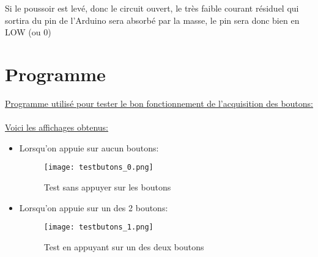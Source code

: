 	Si le poussoir est levé, donc le circuit ouvert, le très faible courant résiduel qui sortira du pin de l'Arduino sera absorbé par la masse, le pin sera donc bien en LOW (ou 0)



\newpage
\section{Programme}
\underline{Programme utilisé pour tester le bon fonctionnement de l'acquisition des boutons:}


\newpage
\paragraph{}
\underline{Voici les affichages obtenus:}
\begin{itemize}
	\item Lorsqu'on appuie sur aucun boutons:
    \begin{figure}[h]
    	\centering
        \texttt{[image: testbutons\_0.png]}
        \caption{Test sans appuyer sur les boutons}
        \label{testbutons0}
    \end{figure}
    
    \item Lorsqu'on appuie sur un des 2 boutons:
    \begin{figure}[h]
    	\centering
        \texttt{[image: testbutons\_1.png]}
        \caption{Test en appuyant sur un des deux boutons}
        \label{testbutons1}
    \end{figure}
\end{itemize}

